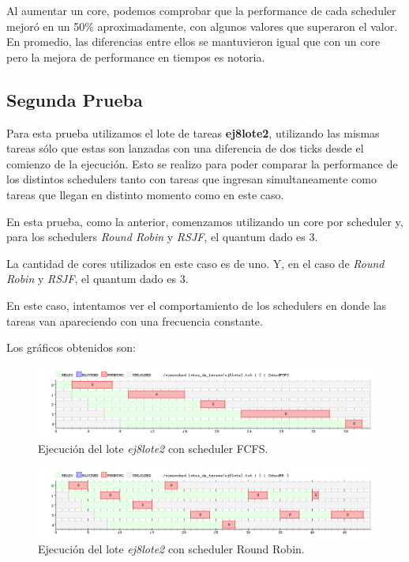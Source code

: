 Al aumentar un core, podemos comprobar que la performance de cada scheduler mejoró en un 50\% aproximadamente, con algunos valores que superaron el valor. En promedio, las diferencias entre ellos se mantuvieron igual que con un core pero la mejora de performance en tiempos es notoria.

\subsection{Segunda Prueba}

Para esta prueba utilizamos el lote de tareas \textbf{ej8lote2}, utilizando las mismas tareas sólo que estas son lanzadas con una diferencia de dos ticks desde el comienzo de la ejecución. Esto se realizo para poder comparar la performance de los distintos schedulers tanto con tareas que ingresan simultaneamente como tareas que llegan en distinto momento como en este caso.

En esta prueba, como la anterior, comenzamos utilizando un core por scheduler y, para los schedulers \emph{Round Robin} y \emph{RSJF}, el quantum dado es 3.

La cantidad de cores utilizados en este caso es de uno. Y, en el caso de \emph{Round Robin} y \emph{RSJF}, el quantum dado es 3.

En este caso, intentamos ver el comportamiento de los schedulers en donde las tareas van apareciendo con una frecuencia constante.

Los gráficos obtenidos son:

\begin{figure}[!h]
	\begin{center}
		\includegraphics[width=500px]{imagenes/ej8_prueba2_fcfs.png}
		\caption{Ejecución del lote \emph{ej8lote2} con scheduler FCFS.}
		\label{fig:grafico_ej8_prueba2_fcfs}
	\end{center}
\end{figure}

\begin{figure}[!h]
	\begin{center}
		\includegraphics[width=500px]{imagenes/ej8_prueba2_rr.png}
		\caption{Ejecución del lote \emph{ej8lote2} con scheduler Round Robin.}
		\label{fig:grafico_ej8_prueba2_rr}
	\end{center}
\end{figure}

